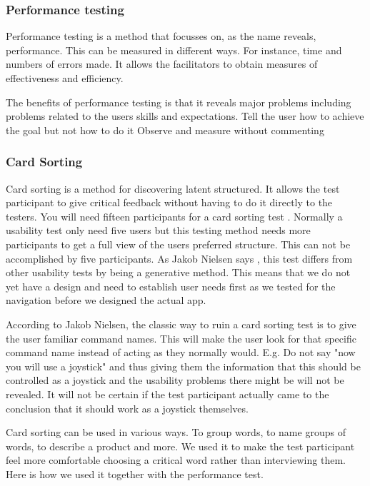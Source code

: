 \subsubsection{Performance testing}

Performance testing is a method that focusses on, as the name reveals, performance. This can be measured in different ways. For instance, time and numbers of errors made.
It allows the facilitators to obtain measures of effectiveness and efficiency. \cite{performance}

The benefits of performance testing is that it reveals major problems including problems related to the users skills and expectations. \cite{performance}
Tell the user how to achieve the goal but not how to do it \cite{} 
Observe and measure without commenting\cite{}

\subsubsection{Card Sorting}
Card sorting is a method for discovering latent structured. \cite{cards}
It allows the test participant to give critical feedback without having to do it directly to the testers. 
You will need fifteen participants for a card sorting test \cite{cardSorting}. Normally a usability test only need five users but this testing method needs more participants to get a full view of the users preferred structure. This can not be accomplished by five participants. \cite{cardSorting}
As Jakob Nielsen says \cite{cardSorting}, this test differs from other usability tests by being a generative method. This means that we do not yet have a design and need to establish user needs first as we tested for the navigation before we designed the actual app. 

According to Jakob Nielsen, the classic way to ruin a card sorting test is to give the user familiar command names. This will make the user look for that specific command name instead of acting as they normally would.\cite{cardSorting}
E.g. Do not say "now you will use a joystick" and thus giving them the information that this should be controlled as a joystick and the usability problems there might be will not be revealed. It will not be certain if the test participant actually came to the conclusion that it should work as a joystick
themselves. 

Card sorting can be used in various ways. To group words, to name groups of words, to describe a product and more. 
We used it to make the test participant feel more comfortable choosing a critical word rather than interviewing them. 
Here is how we used it together with the performance test.

